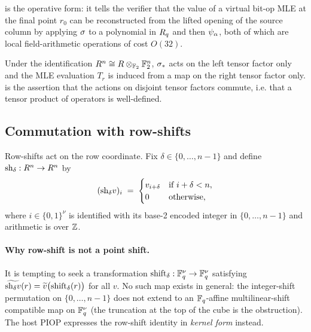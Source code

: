  is the operative form: it tells the
verifier that the value of a virtual bit-op MLE at the final point
$r_0$ can be reconstructed from the lifted opening of the source
column by applying $\sigma$ to a polynomial in $R_q$ and then
$\psi_{\alpha}$, both of which are local field-arithmetic operations of cost
$O(32)$.

\begin{remark}
Under the identification $R^n \cong R \otimes_{\mathbb{F}_2}
\mathbb{F}_2^n$, $\sigma_*$ acts on the left tensor factor only and the MLE
evaluation $T_r$ is induced from a map on the right tensor factor
only.  is the assertion that the actions on
disjoint tensor factors commute, i.e. that a tensor product of
operators is well-defined.
\end{remark}

\subsection{Commutation with row-shifts}
\label{subsec:row-shift-commute}

Row-shifts act on the row coordinate. Fix $\delta \in \{0,\ldots,n-1\}$
and define $\mathrm{sh}_{\delta} : R^n \to R^n$ by
\[
  (\mathrm{sh}_{\delta} v)_i \;=\;
  \begin{cases} v_{i+\delta} & \text{if } i + \delta < n, \\ 0 & \text{otherwise,} \end{cases}
\]
where $i \in \{0,1\}^{\nu}$ is identified with its base-2 encoded
integer in $\{0,\ldots,n-1\}$ and arithmetic is over $\mathbb{Z}$.

\paragraph{Why row-shift is not a point shift.} It is tempting to seek
a transformation $\mathrm{shift}_\delta : \mathbb{F}_q^{\nu} \to \mathbb{F}_q^{\nu}$
satisfying $\widetilde{\mathrm{sh}_{\delta} v}(r) = \widetilde{v}\big(\mathrm{shift}_\delta(r)\big)$
for all $v$. No such map exists in general: the integer-shift
permutation on $\{0,\ldots,n-1\}$ does not extend to an
$\mathbb{F}_q$-affine multilinear-shift compatible map on $\mathbb{F}_q^{\nu}$ (the
truncation at the top of the cube is the obstruction). The host PIOP
expresses the row-shift identity in \emph{kernel form} instead.

